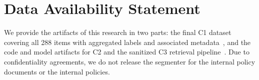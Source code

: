\section*{Data Availability Statement}
We provide the artifacts of this research in two parts: the final C1 dataset covering all 288 items with aggregated labels and associated metadata~\cite{garcia2026dataset}, and the code and model artifacts for C2 and the sanitized C3 retrieval pipeline~\cite{garcia2026pipeline}.
Due to confidentiality agreements, we do not release the segmenter for the internal policy documents or the internal policies.